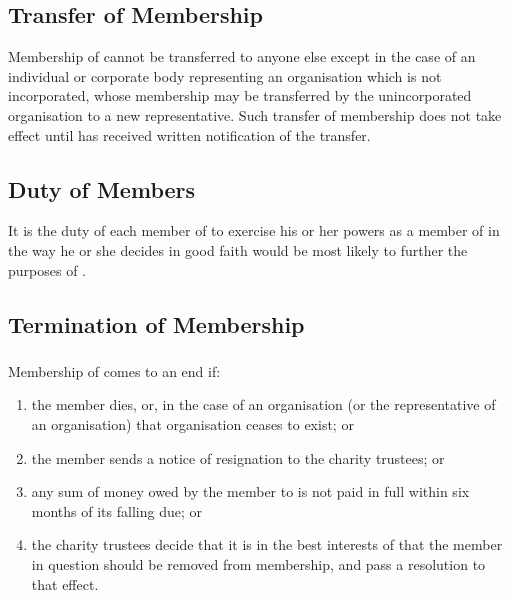     \subsection{Transfer of Membership}\label{sec:transfer}
    Membership of \shortname{} cannot be transferred to anyone else except in the case of an individual or corporate body representing an organisation which is not incorporated, whose membership may be transferred by the unincorporated organisation to a new representative. Such transfer of membership does not take effect until \shortname{} has received written notification of the transfer.

    \subsection{Duty of Members}\label{sec:duty}
    It is the duty of each member of \shortname{} to exercise his or her powers as a member of \shortname{} in the way he or she decides in good faith would be most likely to further the purposes of \shortname{}.

    \subsection{Termination of Membership}\label{sec:terminiation}

        \subsubsection{}
        Membership of \shortname{} comes to an end if:
        \begin{enumerate}
            \item the member dies, or, in the case of an organisation (or the representative of an organisation) that organisation ceases to exist; or
            \item the member sends a notice of resignation to the charity trustees; or
            \item any sum of money owed by the member to \shortname{} is not paid in full within six months of its falling due; or
            \item the charity trustees decide that it is in the best interests of \shortname{} that the member in question should be removed from membership, and pass a resolution to that effect.
        \end{enumerate}

